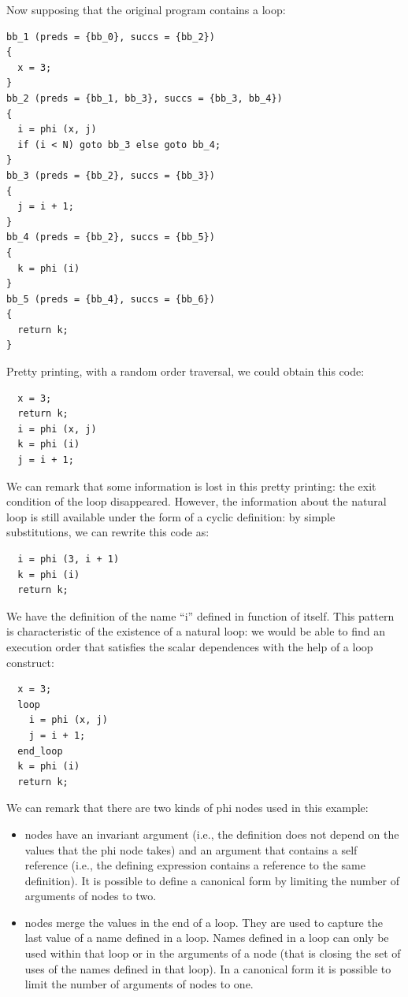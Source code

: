 Now supposing that the original program contains a loop:
\begin{verbatim}
bb_1 (preds = {bb_0}, succs = {bb_2})
{
  x = 3;
}
bb_2 (preds = {bb_1, bb_3}, succs = {bb_3, bb_4})
{
  i = phi (x, j)
  if (i < N) goto bb_3 else goto bb_4;
}
bb_3 (preds = {bb_2}, succs = {bb_3})
{
  j = i + 1;
}
bb_4 (preds = {bb_2}, succs = {bb_5})
{
  k = phi (i)
}
bb_5 (preds = {bb_4}, succs = {bb_6})
{
  return k;
}
\end{verbatim}
Pretty printing, with a random order traversal, we could obtain this
\SSA{} code:
\begin{verbatim}
  x = 3;
  return k;
  i = phi (x, j)
  k = phi (i)
  j = i + 1;
\end{verbatim}
We can remark that some information is lost in this pretty printing:
the exit condition of the loop disappeared.  However, the information
about the natural loop is still available under the form of a cyclic
definition: by simple substitutions, we can rewrite this \SSA{} code
as:
\begin{verbatim}
  i = phi (3, i + 1)
  k = phi (i)
  return k;
\end{verbatim}
We have the definition of the \SSA{} name ``i'' defined in function of
itself.  This pattern is characteristic of the existence of a natural
loop: we would be able to find an execution order that satisfies the
scalar dependences with the help of a loop construct:
\begin{verbatim}
  x = 3;
  loop
    i = phi (x, j)
    j = i + 1;
  end_loop
  k = phi (i)
  return k;
\end{verbatim}
We can remark that there are two kinds of phi nodes used in this
example:
\begin{itemize}
\item \loopphi{} nodes have an invariant argument (i.e., the
  definition does not depend on the values that the phi node takes)
  and an argument that contains a self reference (i.e., the defining
  expression contains a reference to the same \loopphi{} definition).
  It is possible to define a canonical \SSA{} form by limiting the
  number of arguments of \loopphi{} nodes to two.
\item \closephi{} nodes merge the values in the end of a loop.  They
  are used to capture the last value of a name defined in a loop.
  Names defined in a loop can only be used within that loop or in the
  arguments of a \closephi{} node (that is closing the set of uses of
  the names defined in that loop).  In a canonical \SSA{} form it is
  possible to limit the number of arguments of \closephi{} nodes to
  one.
\end{itemize}

